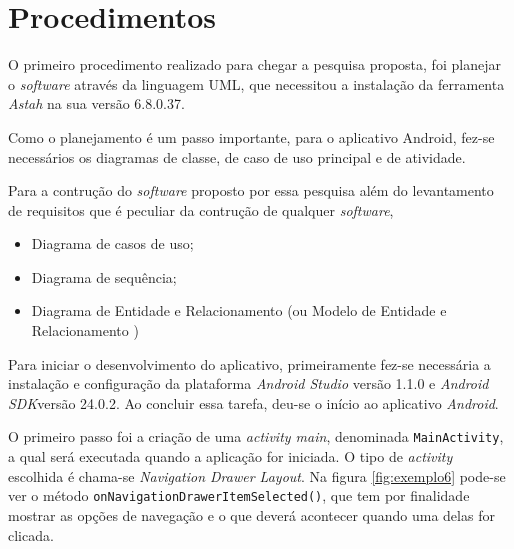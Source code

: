 \section{Procedimentos}
	
	\par O primeiro procedimento realizado para chegar a pesquisa proposta, foi
planejar o \textit{software} através da linguagem UML, que necessitou a
instalação da ferramenta \textit{Astah} na sua versão 6.8.0.37.

	\par Como o planejamento é um passo importante, para o aplicativo Android,
fez-se necessários os diagramas de classe, de caso de uso principal e de
atividade.
	
	\par Para a contrução do \textit{software} proposto por essa pesquisa além do
levantamento de requisitos que é peculiar da contrução de qualquer
\textit{software}, 

	\begin{itemize}
	  \item Diagrama de casos de uso; 
	  \item Diagrama de sequência;
	  \item Diagrama de Entidade e Relacionamento (ou Modelo de Entidade e
	  Relacionamento )	
	\end{itemize}
	
	
	\par Para iniciar o desenvolvimento do aplicativo, primeiramente fez-se
necessária a instalação e configuração da plataforma \textit{Android Studio}
versão 1.1.0 e \textit{Android SDK}versão 24.0.2. Ao concluir essa tarefa,
deu-se o início ao aplicativo \textit{Android}.

	\par O primeiro passo foi a criação de uma \textit{activity main}, denominada
\texttt{MainActivity}, a qual será executada  quando a aplicação  for iniciada.
O tipo de \textit{activity} escolhida é chama-se \textit{Navigation Drawer
Layout}. Na figura \ref{fig:exemplo6} pode-se ver o método
\texttt{onNavigationDrawerItemSelected()}, que tem por finalidade mostrar as
opções de navegação e o que deverá acontecer quando uma delas for clicada. 
	
